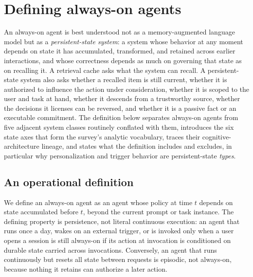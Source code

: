 \section{Defining always-on agents}\label{sec:definition}


An always-on agent is best understood not as a memory-augmented language model but as a \emph{persistent-state system}: a system whose behavior at any moment depends on state it has accumulated, transformed, and retained across earlier interactions, and whose correctness depends as much on governing that state as on recalling it. A retrieval cache asks what the system can recall. A persistent-state system also asks whether a recalled item is still current, whether it is authorized to influence the action under consideration, whether it is scoped to the user and task at hand, whether it descends from a trustworthy source, whether the decisions it licenses can be reversed, and whether it is a passive fact or an executable commitment. The definition below separates always-on agents from five adjacent system classes routinely conflated with them, introduces the six state axes that form the survey's analytic vocabulary, traces their cognitive-architecture lineage, and states what the definition includes and excludes, in particular why personalization and trigger behavior are persistent-state \emph{types}.

\subsection{An operational definition}\label{subsec:operational}

We define an always-on agent as an agent whose policy at time $t$ depends on state accumulated before $t$, beyond the current prompt or task instance. The defining property is persistence, not literal continuous execution: an agent that runs once a day, wakes on an external trigger, or is invoked only when a user opens a session is still always-on if its action at invocation is conditioned on durable state carried across invocations. Conversely, an agent that runs continuously but resets all state between requests is episodic, not always-on, because nothing it retains can authorize a later action.

